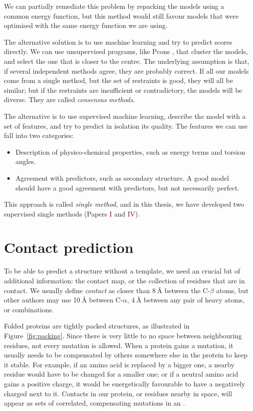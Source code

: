 We can partially remediate this problem by repacking the models using a common energy function, but this method would still favour models that were optimised with the same energy function we are using.


The alternative solution is to use machine learning and try to predict scores directly.
We can use unsupervised programs, like Pcons \citep{pcons}, that cluster the models, and select the one that is closer to the centre.
The underlying assumption is that, if several independent methods agree, they are probably correct.
If all our models come from a single method, but the set of restraints is good, they will all be similar; but if the restraints are insufficient or contradictory, the models will be diverse.
They are called \emph{consensus methods}.

The alternative is to use supervised machine learning, describe the model with a set of features, and try to predict in isolation its quality. 
The features we can use fall into two categories:

\begin{itemize}
\item Description of physico-chemical properties, such as energy terms and torsion angles.
\item Agreement with predictors, such as secondary structure. A good model should have a good agreement with predictors, but not necessarily perfect.
\end{itemize}

This approach is called \emph{single method}, and in this thesis, we have developed two supervised single methods (Papers \textcolor{Maroon}{I} and \textcolor{Maroon}{IV}).


\section{Contact prediction}\label{sec:contacts}
To be able to predict a structure without a template, we need an crucial  bit of additional information: the contact map, or the collection of residues that are in contact.
We usually define \emph{contact}  as closer than 8$\SI{}{\angstrom}$ between the C-$\beta$ atoms,
but other authors may use 10$\SI{}{\angstrom}$ between C-$\alpha$, 4$\SI{}{\angstrom}$ between any pair of heavy atoms, or combinations.

Folded proteins  are tightly packed structures, as illustrated in Figure~\ref{fig:packing}.
Since there is very little to no space between neighbouring residues, not every mutation is allowed.
When a protein gains a mutation, it usually needs to be compensated by others somewhere else in the protein to keep it stable.
For example, if an amino acid is replaced by a bigger one, a nearby residue would have to be changed for a smaller one; or if a neutral amino acid gains a positive charge, it would be energetically favourable to have a negatively charged next to it.
Contacts in our protein, or residues nearby in space, will appear as sets of correlated, compensating mutations in an \MSA.


